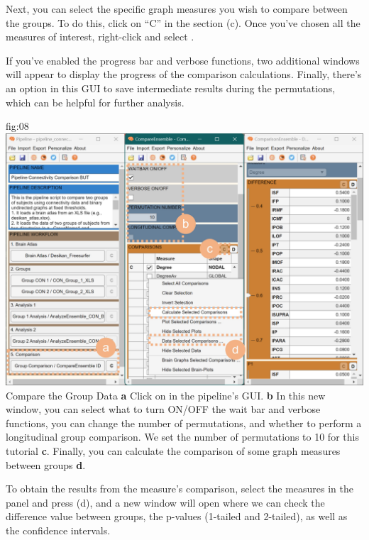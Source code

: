 \documentclass[justified]{tufte-handout}
\begin{document}
Next, you can select the specific graph measures you wish to compare between the groups. To do this, click on “C” in the  section (c). Once you've chosen all the measures of interest, right-click and select .

If you've enabled the progress bar and verbose functions, two additional windows will appear to display the progress of the comparison calculations. Finally, there's an option in this GUI to save intermediate results during the permutations, which can be helpful for further analysis.

	{fig:08}
	{
	\includegraphics{fig08.jpg}
	}
	{Compare the Group Data}
	{
	{\bf a} Click on  in the pipeline's GUI.
	{\bf b} In this new window, you can select what to turn ON/OFF the wait bar and verbose functions, you can change the number of permutations, and whether to perform a longitudinal group comparison. We set the number of permutations to 10 for this tutorial {\bf c}. Finally, you can calculate the comparison of some graph measures between groups {\bf d}.
	}
 
To obtain the results from the measure's comparison, select the measures in the  panel and press ({d}), and a new window will open where we can check the difference value between groups, the p-values (1-tailed and 2-tailed), as well as the confidence intervals.
\end{document}
